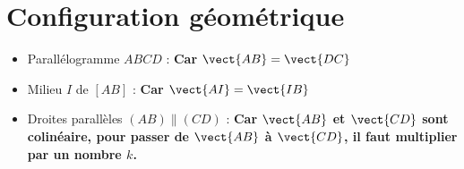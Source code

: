 \documentclass{article}
\begin{document}
\section{Configuration géométrique}
\begin{itemize}
\item Parallélogramme $ABCD$ : \textbf{Car $\vect{AB} = \vect{DC}$}
\item Milieu $I$ de $[AB]$ : \textbf{Car $\vect{AI} = \vect{IB}$}
\item Droites parallèles $(AB) \parallel (CD)$ : \textbf{Car $\vect{AB}$ et $\vect{CD}$ sont colinéaire, pour passer de $\vect{AB}$ à $\vect{CD}$, il faut multiplier par un nombre $k$.}
\end{itemize}
\end{document}
